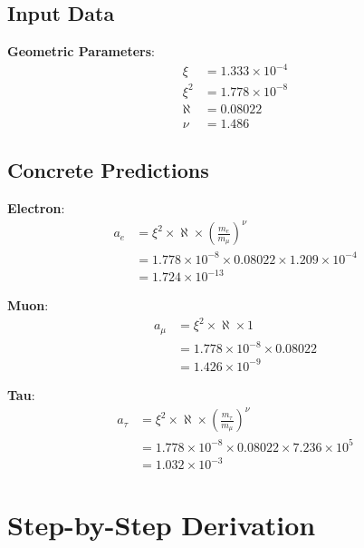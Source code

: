 \documentclass[12pt,a4paper]{article}
\newcommand{\xipar}{\xi}
\newcommand{\nulep}{\nu}
\begin{document}
	\subsection{Input Data}
	
	\textbf{Geometric Parameters}:
	\begin{align}
		\xipar &= 1{.}333 \times 10^{-4} \\
		\xipar^2 &= 1{.}778 \times 10^{-8} \\
		\aleph &= 0{.}08022 \\
		\nulep &= 1{.}486
	\end{align}
	
	\subsection{Concrete Predictions}
	
	\textbf{Electron}:
	\begin{align}
		a_e &= \xipar^2 \times \aleph \times \left(\frac{m_e}{m_\mu}\right)^\nulep \\
		&= 1{.}778 \times 10^{-8} \times 0{.}08022 \times 1{.}209 \times 10^{-4} \\
		&= 1{.}724 \times 10^{-13}
	\end{align}
	
	\textbf{Muon}:
	\begin{align}
		a_\mu &= \xipar^2 \times \aleph \times 1 \\
		&= 1{.}778 \times 10^{-8} \times 0{.}08022 \\
		&= 1{.}426 \times 10^{-9}
	\end{align}
	
	\textbf{Tau}:
	\begin{align}
		a_\tau &= \xipar^2 \times \aleph \times \left(\frac{m_\tau}{m_\mu}\right)^\nulep \\
		&= 1{.}778 \times 10^{-8} \times 0{.}08022 \times 7{.}236 \times 10^5 \\
		&= 1{.}032 \times 10^{-3}
	\end{align}
	
	\section{Step-by-Step Derivation}
	
\end{document}

